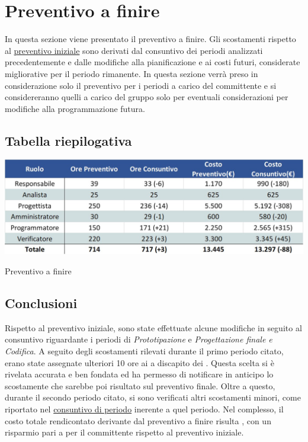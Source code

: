 \newpage
\section{Preventivo a finire} \label{PreventivoFinire}

In questa sezione viene presentato il preventivo a finire. Gli scostamenti rispetto al \hyperref[Preventivo]{preventivo iniziale} sono derivati dal consuntivo dei periodi analizzati precedentemente e dalle modifiche alla pianificazione e ai costi futuri, considerate migliorative per il periodo rimanente. In questa sezione verrà preso in considerazione solo il preventivo per i periodi a carico del committente e si considereranno quelli a carico del gruppo solo per eventuali considerazioni per modifiche alla programmazione futura.

\subsection{Tabella riepilogativa}
\begin{table}[h!]
	\centerline{\includegraphics[scale=0.60]{img/Preventivo/Consuntivo/PreventivoFinire.jpg}}
	\caption{Preventivo a finire}
\end{table}

\subsection{Conclusioni}
Rispetto al preventivo iniziale, sono state effettuate alcune modifiche in seguito al consuntivo riguardante i periodi di \emph{Prototipazione} e \emph{Progettazione finale e Codifica}. A seguito degli scostamenti rilevati durante il primo periodo citato, erano state assegnate ulteriori 10 ore ai \progrs{} a discapito dei \progs{}. Questa scelta si è rivelata accurata e ben fondata ed ha permesso di notificare in anticipo lo scostamente che sarebbe poi risultato sul preventivo finale. Oltre a questo, durante il secondo periodo citato, si sono verificati altri scostamenti minori, come riportato nel \hyperref[ConsuntivoPeriodoProgettazione]{consuntivo di periodo} inerente a quel periodo. Nel complesso, il costo totale rendicontato derivante dal preventivo a finire risulta , con un risparmio pari a  per il committente rispetto al preventivo iniziale.
